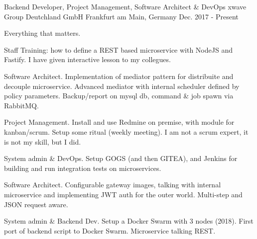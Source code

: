 

\begin{cventries}

  \cventry
    {Backend Developer, Project Management, Software Architect \& DevOps} %
    {xwave Group Deutchland GmbH} %
    {Frankfurt am Main, Germany} %
    {Dec. 2017 - Present} %
    {
      \begin{cvitems} %
        \item {Everything that matters.}
        \item {Staff Training: how to define a REST based microservice with NodeJS and Fastify. I have given interactive lesson to my collegues.}
        \item {Software Architect. Implementation of mediator pattern for distribuite and decouple microservice. Advanced mediator with internal scheduler defined by policy parameters. Backup/report on mysql db, command \& job spawn via RabbitMQ.}
        \item {Project Management. Install and use Redmine on premise, with module for kanban/scrum. Setup some ritual (weekly meeting). I am not a scrum expert, it is not my skill, but I did.}
        \item {System admin \& DevOps. Setup GOGS (and then GITEA), and Jenkins for building and run integration tests on microservices.}
        \item {Software Architect. Configurable gateway images, talking with internal microservice and implementing JWT auth for the outer world. Multi-step and JSON request aware.}
        \item {System admin \& Backend Dev. Setup a Docker Swarm with 3 nodes (2018). First port of backend script to Docker Swarm. Microservice talking REST.}
      \end{cvitems}
    }


\end{cventries}
